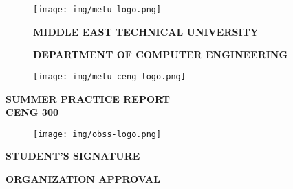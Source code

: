 \begin{titlepage}
  \begin{center}

  \begin{figure}[ht]
    \begin{minipage}[l]{.09\textwidth}
      \texttt{[image: img/metu-logo.png]}
    \end{minipage}
    \begin{minipage}[c]{.8\textwidth}
      \centering
      \large{
        \textbf{MIDDLE EAST TECHNICAL UNIVERSITY}
      }

      \normalsize{
        \textbf{DEPARTMENT OF COMPUTER ENGINEERING}
      }
    \end{minipage}
    \begin{minipage}[r]{.09\textwidth}
      \texttt{[image: img/metu-ceng-logo.png]}
    \end{minipage}
  \end{figure}
  
  \vspace{16pt}
  \large{
    \textbf{SUMMER PRACTICE REPORT}
  } \\
  \large{
    \textbf{CENG 300}
  }

  \vspace{48pt}
    \vspace{-8pt}
    \begin{figure}[ht]
      \centering
      \texttt{[image: img/obss-logo.png]}
    \end{figure}

  \vspace{24pt}
  \begin{minipage}{.49\textwidth}
    \centering
    \normalsize{
      \textbf{STUDENT'S SIGNATURE}
    }
  \end{minipage}
  \begin{minipage}{.49\textwidth}
    \centering
    \normalsize{
      \textbf{ORGANIZATION APPROVAL}
    }
  \end{minipage}

  \end{center}
\end{titlepage}
  
